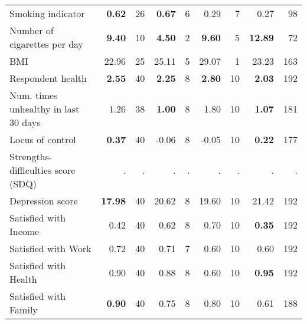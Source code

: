 \begin{tabular}{l r r r r r r r r}
Smoking indicator & \textbf{     0.62} &        26 & \textbf{     0.67} &         6 &      0.29 &         7 &      0.27 &        98 \\
Number of cigarettes per day & \textbf{     9.40} &        10 & \textbf{     4.50} &         2 & \textbf{     9.60} &         5 & \textbf{    12.89} &        72 \\
BMI &     22.96 &        25 &     25.11 &         5 &     29.07 &         1 &     23.23 &       163 \\
Respondent health & \textbf{     2.55} &        40 & \textbf{     2.25} &         8 & \textbf{     2.80} &        10 & \textbf{     2.03} &       192 \\
Num. times unhealthy in last 30 days &      1.26 &        38 & \textbf{     1.00} &         8 &      1.80 &        10 & \textbf{     1.07} &       181 \\
Locus of control & \textbf{     0.37} &        40 &     -0.06 &         8 &     -0.05 &        10 & \textbf{     0.22} &       177 \\
Strengths-difficulties score (SDQ) &         . & . &         . & . &         . & . &         . & . \\
Depression score & \textbf{    17.98} &        40 &     20.62 &         8 &     19.60 &        10 &     21.42 &       192 \\
Satisfied with Income &      0.42 &        40 &      0.62 &         8 &      0.70 &        10 & \textbf{     0.35} &       192 \\
Satisfied with Work &      0.72 &        40 &      0.71 &         7 &      0.60 &        10 &      0.60 &       192 \\
Satisfied with Health &      0.90 &        40 &      0.88 &         8 &      0.60 &        10 & \textbf{     0.95} &       192 \\
Satisfied with Family & \textbf{     0.90} &        40 &      0.75 &         8 &      0.80 &        10 &      0.61 &       188 \\
\bottomrule
\end{tabular}
